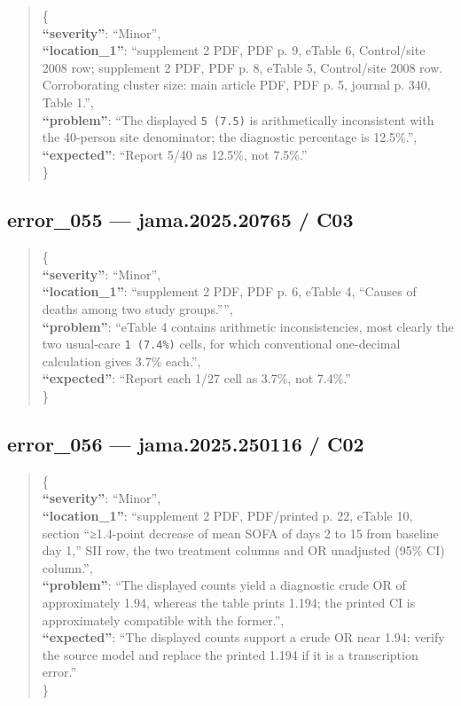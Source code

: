 \documentclass[
  letterpaper,
  9pt]{extreport}
\begin{document}
\begin{quote}
\{\\
\textbf{``severity''}: ``Minor'',\\
\textbf{``location\_1''}: ``supplement 2 PDF, PDF p. 9, eTable 6,
Control/site 2008 row; supplement 2 PDF, PDF p. 8, eTable 5,
Control/site 2008 row. Corroborating cluster size: main article PDF, PDF
p. 5, journal p. 340, Table 1.'',\\
\textbf{``problem''}: ``The displayed \texttt{5\ (7.5)} is
arithmetically inconsistent with the 40-person site denominator; the
diagnostic percentage is 12.5\%.'',\\
\textbf{``expected''}: ``Report 5/40 as 12.5\%, not 7.5\%.''\\
\}
\end{quote}

\hypertarget{error_055--jama202520765--c03}{%
\subsection{error\_055 --- jama.2025.20765 /
C03}\label{error_055--jama202520765--c03}}

\begin{quote}
\{\\
\textbf{``severity''}: ``Minor'',\\
\textbf{``location\_1''}: ``supplement 2 PDF, PDF p. 6, eTable 4,
``Causes of deaths among two study groups.'''',\\
\textbf{``problem''}: ``eTable 4 contains arithmetic inconsistencies,
most clearly the two usual-care \texttt{1\ (7.4\%)} cells, for which
conventional one-decimal calculation gives 3.7\% each.'',\\
\textbf{``expected''}: ``Report each 1/27 cell as 3.7\%, not 7.4\%.''\\
\}
\end{quote}

\hypertarget{error_056--jama2025250116--c02}{%
\subsection{error\_056 --- jama.2025.250116 /
C02}\label{error_056--jama2025250116--c02}}

\begin{quote}
\{\\
\textbf{``severity''}: ``Minor'',\\
\textbf{``location\_1''}: ``supplement 2 PDF, PDF/printed p. 22, eTable
10, section ``≥1.4-point decrease of mean SOFA of days 2 to 15 from
baseline day 1,'' SII row, the two treatment columns and OR unadjusted
(95\% CI) column.'',\\
\textbf{``problem''}: ``The displayed counts yield a diagnostic crude OR
of approximately 1.94, whereas the table prints 1.194; the printed CI is
approximately compatible with the former.'',\\
\textbf{``expected''}: ``The displayed counts support a crude OR near
1.94; verify the source model and replace the printed 1.194 if it is a
transcription error.''\\
\}
\end{quote}
\end{document}
